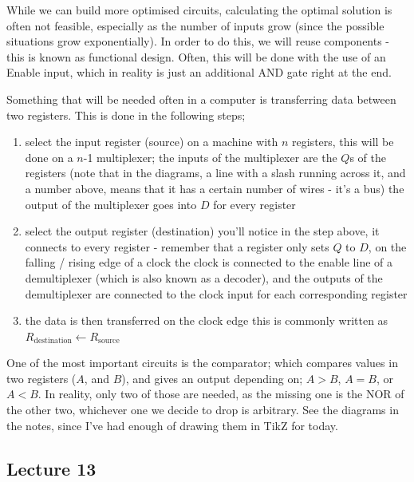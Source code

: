 \documentclass[a4paper, 12pt]{article}
\begin{document}
            While we can build more optimised circuits, calculating the optimal solution is often not feasible, especially as the number of inputs grow (since the possible situations grow exponentially). In order to do this, we will reuse components - this is known as functional design. Often, this will be done with the use of an Enable input, which in reality is just an additional AND gate right at the end.
            \medskip

            Something that will be needed often in a computer is transferring data between two registers. This is done in the following steps;
            \begin{enumerate}[1.]
                \itemsep0em
                \item select the input register (source)
                    \subitem on a machine with $n$ registers, this will be done on a $n$-1 multiplexer; the inputs of the multiplexer are the $Q$s of the registers (note that in the diagrams, a line with a slash running across it, and a number above, means that it has a certain number of wires - it's a bus)
                    \subitem the output of the multiplexer goes into $D$ for every register
                \item select the output register (destination)
                    \subitem you'll notice in the step above, it connects to every register - remember that a register only sets $Q$ to $D$, on the falling / rising edge of a clock
                    \subitem the clock is connected to the enable line of a demultiplexer (which is also known as a decoder), and the outputs of the demultiplexer are connected to the clock input for each corresponding register
                \item the data is then transferred on the clock edge
                    \subitem this is commonly written as $R_\text{destination} \leftarrow R_\text{source}$
            \end{enumerate}
            One of the most important circuits is the comparator; which compares values in two registers ($A$, and $B$), and gives an output depending on; $A > B$, $A = B$, or $A < B$. In reality, only two of those are needed, as the missing one is the NOR of the other two, whichever one we decide to drop is arbitrary. See the diagrams in the notes, since I've had enough of drawing them in TikZ for today.
        \subsection*{Lecture 13}
\end{document}
